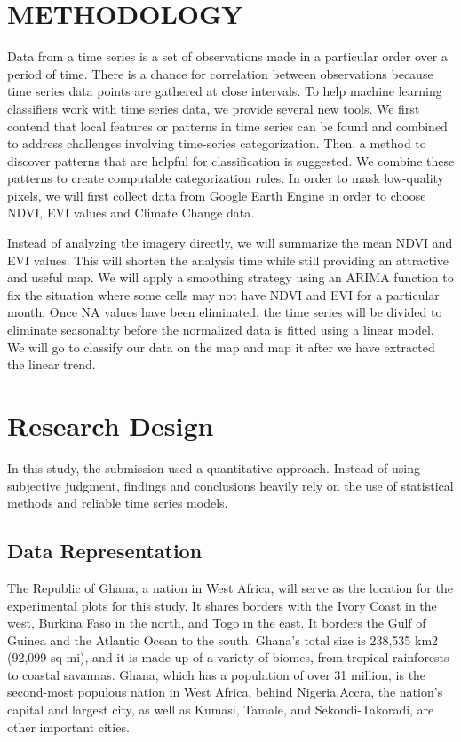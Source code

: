 \documentclass[
  onepage,
  openany]{scrbook}
\begin{document}
\hypertarget{methodology}{%
\section{METHODOLOGY}\label{methodology}}

Data from a time series is a set of observations made in a particular
order over a period of time. There is a chance for correlation between
observations because time series data points are gathered at close
intervals. To help machine learning classifiers work with time series
data, we provide several new tools. We first contend that local features
or patterns in time series can be found and combined to address
challenges involving time-series categorization. Then, a method to
discover patterns that are helpful for classification is suggested. We
combine these patterns to create computable categorization rules. In
order to mask low-quality pixels, we will first collect data from Google
Earth Engine in order to choose NDVI, EVI values and Climate Change
data.

Instead of analyzing the imagery directly, we will summarize the mean
NDVI and EVI values. This will shorten the analysis time while still
providing an attractive and useful map. We will apply a smoothing
strategy using an ARIMA function to fix the situation where some cells
may not have NDVI and EVI for a particular month. Once NA values have
been eliminated, the time series will be divided to eliminate
seasonality before the normalized data is fitted using a linear model.
We will go to classify our data on the map and map it after we have
extracted the linear trend.

\hypertarget{research-design}{%
\section{Research Design}\label{research-design}}

In this study, the submission used a quantitative approach. Instead of
using subjective judgment, findings and conclusions heavily rely on the
use of statistical methods and reliable time series models.

\hypertarget{data-representation}{%
\subsection{Data Representation}\label{data-representation}}

The Republic of Ghana, a nation in West Africa, will serve as the
location for the experimental plots for this study. It shares borders
with the Ivory Coast in the west, Burkina Faso in the north, and Togo in
the east. It borders the Gulf of Guinea and the Atlantic Ocean to the
south. Ghana's total size is 238,535 km2 (92,099 sq mi), and it is made
up of a variety of biomes, from tropical rainforests to coastal
savannas. Ghana, which has a population of over 31 million, is the
second-most populous nation in West Africa, behind Nigeria.Accra, the
nation's capital and largest city, as well as Kumasi, Tamale, and
Sekondi-Takoradi, are other important cities.
\end{document}
